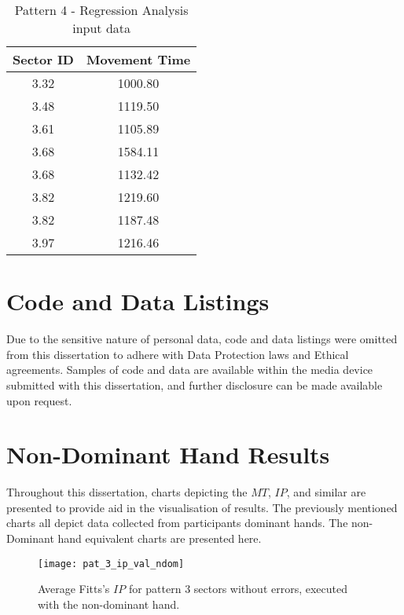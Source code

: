 \begin{appendices}
		\begin{table}[h]
			\centering
			\caption{Pattern 4 - Regression Analysis input data}
			\label{tab_pat_4_reg}
			\begin{tabular}{|c|c|}
				\hline
				\textbf{Sector ID} & \textbf{Movement Time} \\ \hline
				3.32               & 1000.80                \\ \hline
				3.48               & 1119.50                \\ \hline
				3.61               & 1105.89                \\ \hline
				3.68               & 1584.11                \\ \hline
				3.68               & 1132.42                \\ \hline
				3.82               & 1219.60                \\ \hline
				3.82               & 1187.48                \\ \hline
				3.97               & 1216.46                \\ \hline
			\end{tabular}
		\end{table}
		
	\section{Code and Data Listings}
		Due to the sensitive nature of personal data, code and data listings were omitted from this dissertation to adhere with Data Protection laws and Ethical agreements. Samples of code and data are available within the media device submitted with this dissertation, and further disclosure can be made available upon request.
		
	\section{Non-Dominant Hand Results}
		Throughout this dissertation, charts depicting the \(MT\), \(IP\), and similar are presented to provide aid in the visualisation of results. The previously mentioned charts all depict data collected from participants dominant hands. The non-Dominant hand equivalent charts are presented here.
		
		\begin{figure}[!htb]
			\centering
			\texttt{[image: pat\_3\_ip\_val\_ndom]}
			\caption{Average Fitts's \(IP\) for pattern 3 sectors without errors, executed with the non-dominant hand.}
			\label{fig_pat_3_ip_ndom}
		\end{figure}		
		

\end{appendices}
